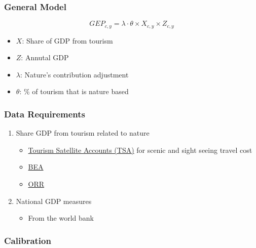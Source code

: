 \documentclass[
  letterpaper,
  DIV=11,
  numbers=noendperiod]{scrartcl}
\providecommand{\tightlist}{%
  \setlength{\itemsep}{0pt}\setlength{\parskip}{0pt}}\usepackage{longtable,booktabs,array}
\begin{document}
\hypertarget{general-model}{%
\subsubsection{General Model}\label{general-model}}

\[
GEP_{c,y} = \lambda \cdot \theta \times X_{c,y} \times Z_{c,y}
\]

\begin{itemize}
\tightlist
\item
  \(X\): Share of GDP from tourism
\item
  \(Z\): Annutal GDP
\item
  \(\lambda\): Nature's contribution adjustment
\item
  \(\theta\): \% of tourism that is nature based
\end{itemize}

\hypertarget{data-requirements}{%
\subsubsection{Data Requirements}\label{data-requirements}}

\begin{enumerate}
\def\labelenumi{\arabic{enumi}.}
\tightlist
\item
  Share GDP from tourism related to nature

  \begin{itemize}
  \tightlist
  \item
    \href{https://www.trade.gov/travel-and-tourism-satellite-account-ttsa-program}{Tourism
    Satellite Accounts (TSA)} for scenic and sight seeing travel cost
  \item
    \href{https://www.bea.gov/data/special-topics/outdoor-recreation}{BEA}
  \item
    \href{https://recreationroundtable.org/resources/national-recreation-data/}{ORR}
  \end{itemize}
\item
  National GDP measures

  \begin{itemize}
  \tightlist
  \item
    From the world bank
  \end{itemize}
\end{enumerate}

\hypertarget{calibration}{%
\subsubsection{Calibration}\label{calibration}}
\end{document}
